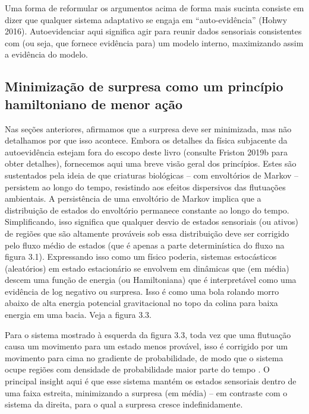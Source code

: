 \documentclass[
  12pt,
]{book}
\begin{document}
Uma forma de reformular os argumentos acima de forma mais sucinta consiste em dizer que qualquer sistema adaptativo se engaja em ``auto-evidência'' (Hohwy 2016). Autoevidenciar aqui significa agir para reunir dados sensoriais consistentes com (ou seja, que fornece evidência para) um modelo interno, maximizando assim a evidência do modelo.

\hypertarget{minimizauxe7uxe3o-de-surpresa-como-um-princuxedpio-hamiltoniano-de-menor-auxe7uxe3o}{%
\subsection{Minimização de surpresa como um princípio hamiltoniano de menor ação}\label{minimizauxe7uxe3o-de-surpresa-como-um-princuxedpio-hamiltoniano-de-menor-auxe7uxe3o}}

Nas seções anteriores, afirmamos que a surpresa deve ser minimizada, mas não detalhamos por que isso acontece. Embora os detalhes da física subjacente da autoevidência estejam fora do escopo deste livro (consulte Friston 2019b para obter detalhes), fornecemos aqui uma breve visão geral dos princípios. Estes são sustentados pela ideia de que criaturas biológicas -- com envoltórios de Markov -- persistem ao longo do tempo, resistindo aos efeitos dispersivos das flutuações ambientais. A persistência de uma envoltório de Markov implica que a distribuição de estados do envoltório permanece constante ao longo do tempo. Simplificando, isso significa que qualquer desvio de estados sensoriais (ou ativos) de regiões que são altamente prováveis \hspace{0pt}\hspace{0pt}sob essa distribuição deve ser corrigido pelo fluxo médio de estados (que é apenas a parte determinística do fluxo na figura 3.1). Expressando isso como um físico poderia, sistemas estocásticos (aleatórios) em estado estacionário se envolvem em dinâmicas que (em média) descem uma função de energia (ou Hamiltoniana) que é interpretável como uma evidência de log negativo ou surpresa. Isso é como uma bola rolando morro abaixo de alta energia potencial gravitacional no topo da colina para baixa energia em uma bacia. Veja a figura 3.3.

Para o sistema mostrado à esquerda da figura 3.3, toda vez que uma flutuação causa um movimento para um estado menos provável, isso é corrigido por um movimento para cima no gradiente de probabilidade, de modo que o sistema ocupe regiões com densidade de probabilidade maior parte do tempo . O principal insight aqui é que esse sistema mantém os estados sensoriais dentro de uma faixa estreita, minimizando a surpresa (em média) -- em contraste com o sistema da direita, para o qual a surpresa cresce indefinidamente.
\end{document}
